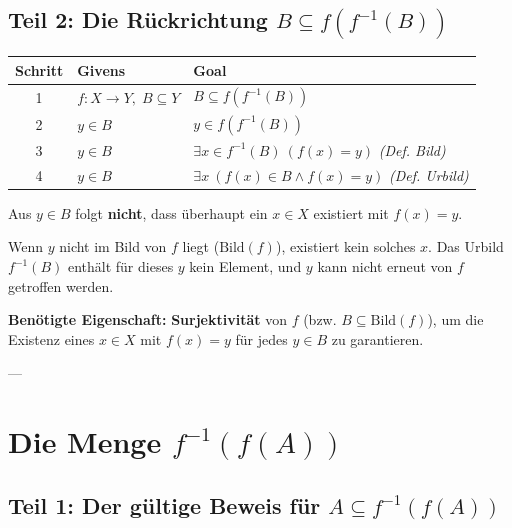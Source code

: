 \documentclass[11pt,a4paper]{article}
\begin{document}
\subsection*{Teil 2: Die Rückrichtung $B \subseteq f(f^{-1}(B))$}

\begin{vellemantable}
\centering
\begin{tabular}{cll}
\textbf{Schritt} & \textbf{Givens} & \textbf{Goal} \\ \hline
1 & $f: X \to Y, \; B \subseteq Y$ & $B \subseteq f(f^{-1}(B))$ \\
2 & $y \in B$ & $y \in f(f^{-1}(B))$ \\
3 & $y \in B$ & $\exists x \in f^{-1}(B) \: (f(x) = y)$ \quad \textit{(Def. Bild)} \\
4 & $y \in B$ & $\exists x \: (f(x) \in B \land f(x) = y)$ \quad \textit{(Def. Urbild)} \\
\end{tabular}
\end{vellemantable}

\begin{stuckbox}
Aus $y \in B$ folgt \textbf{nicht}, dass überhaupt ein $x \in X$ existiert mit $f(x) = y$.

Wenn $y$ nicht im Bild von $f$ liegt ($\text{Bild}(f)$), existiert kein solches $x$. Das Urbild $f^{-1}(B)$ enthält für dieses $y$ kein Element, und $y$ kann nicht erneut von $f$ getroffen werden.

\medskip
\textbf{Benötigte Eigenschaft:} \textbf{Surjektivität} von $f$ (bzw. $B \subseteq \text{Bild}(f)$), um die Existenz eines $x \in X$ mit $f(x) = y$ für jedes $y \in B$ zu garantieren.
\end{stuckbox}

---

\newpage
\section{Die Menge $f^{-1}(f(A))$}

\subsection*{Teil 1: Der gültige Beweis für $A \subseteq f^{-1}(f(A))$}
\end{document}
